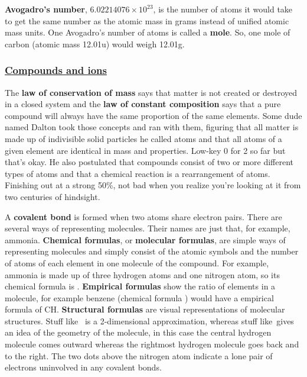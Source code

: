 \documentclass{article}
\begin{document}
\textbf{Avogadro's number}, \(6.02214076\times10^{23}\), is the number of atoms it would take to get the same number as the atomic mass in grams instead of unified atomic mass units. One Avogadro's number of atoms is called a \textbf{mole}. So, one mole of carbon (atomic mass 12.01u) would weigh 12.01g.

\subsubsection{\href{https://www.khanacademy.org/science/ap-chemistry/atoms-compounds-ions-ap/compounds-and-ions-ap/a/daltons-atomic-theory-version-2}{Compounds and ions}}
The \textbf{law of conservation of mass} says that matter is not created or destroyed in a closed system and the \textbf{law of constant composition} says that a pure compound will always have the same proportion of the same elements. Some dude named Dalton took those concepts and ran with them, figuring that all matter is made up of indivisible solid particles he called atoms and that all atoms of a given element are identical in mass and properties. Low-key 0 for 2 so far but that's okay. He also postulated that compounds consist of two or more different types of atoms and that a chemical reaction is a rearrangement of atoms. Finishing out at a strong 50\%, not bad when you realize you're looking at it from two centuries of hindsight.\par
A \textbf{covalent bond} is formed when two atoms share electron pairs. There are several ways of representing molecules. Their names are just that, for example, ammonia. \textbf{Chemical formulas}, or \textbf{molecular formulas}, are simple ways of representing molecules and simply consist of the atomic symbols and the number of atoms of each element in one molecule of the compound. For example, ammonia is made up of three hydrogen atoms and one nitrogen atom, so its chemical formula is . \textbf{Empirical formulas} show the ratio of elements in a molecule, for example benzene (chemical formula ) would have a empirical formula of CH. \textbf{Structural formulas} are visual representations of molecular structures. Stuff like  \, is a 2-dimensional approximation, whereas stuff like\,  gives an idea of the geometry of the molecule, in this case the central hydrogen molecule comes outward whereas the rightmost hydrogen molecule goes back and to the right. The two dots above the nitrogen atom indicate a lone pair of electrons uninvolved in any covalent bonds.\par
\end{document}
